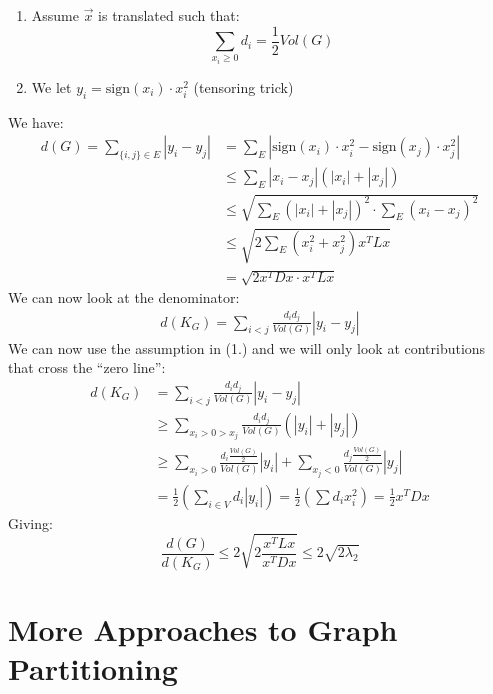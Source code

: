\documentclass[11pt]{article}
\begin{document}
\begin{enumerate}
    \item Assume $\vec{x}$ is translated such that:
    \[
        \sum_{x_i \geq 0} d_i= \frac{1}{2}Vol(G)
    \]
    \item We let $y_i = \text{sign}(x_i) \cdot x_i^2$ (tensoring trick)
\end{enumerate}
We have:
\begin{align*}
    d(G) = \sum_{\{i,j\} \in E} |y_i - y_j| &= \sum_{E} |\text{sign}(x_i)\cdot x_i^2 - \text{sign}(x_j) \cdot x_j^2|\\
    &\leq \sum_E |x_i - x_j| (|x_i| + |x_j|)\\
    &\leq \sqrt{\sum_E (|x_i| + |x_j|)^2 \cdot \sum_E (x_i - x_j)^2}\\
    &\leq \sqrt{2 \sum_E (x_i^2 +x_j^2) x^TLx}\\
    &= \sqrt{2 x^TDx \cdot x^TLx}
\end{align*}
We can now look at the denominator:
\begin{align*}
    d(K_G) = \sum_{i < j } \frac{d_id_j}{Vol(G)} |y_i - y_j|
\end{align*}
We can now use the assumption in (1.) and we will only look at contributions that cross the ``zero line'':
\begin{align*}
    d(K_G) &= \sum_{i < j } \frac{d_id_j}{Vol(G)} |y_i - y_j|\\
    &\geq \sum_{x_i >0>x_j}\frac{d_id_j}{Vol(G)}\left(|y_i| +|y_j|\right)\\
    &\geq \sum_{x_i > 0} \frac{d_i \frac{Vol(G)}{2}}{Vol(G)} |y_i| + \sum_{x_j<0} \frac{d_j \frac{Vol(G)}{2}}{Vol(G)}|y_j|\\
    &= \frac{1}{2}\left(\sum_{i \in V} d_i |y_i|\right) = \frac{1}{2}\left(\sum d_i x_i^2\right) = \frac{1}{2}x^TDx
\end{align*}
Giving:
\[
    \frac{d(G)}{d(K_G)}\leq 2 \sqrt{2 \frac{x^TLx}{x^TDx}}\leq 2 \sqrt{2 \lambda_2}
\]

\section*{More Approaches to Graph Partitioning}
\end{document}
